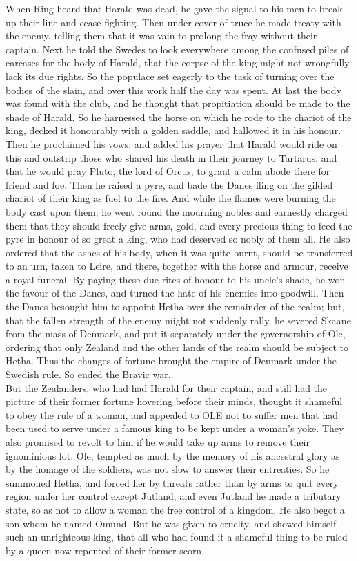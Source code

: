 \documentclass[10pt,a4paper]{report}
\begin{document}
When Ring heard that Harald was dead, he gave the signal to his men to break up their line and cease fighting. Then under cover of truce he made treaty with the enemy, telling them that it was vain to prolong the fray without their captain. Next he told the Swedes to look everywhere among the confused piles of carcases for the body of Harald, that the corpse of the king might not wrongfully lack its due rights. So the populace set eagerly to the task of turning over the bodies of the slain, and over this work half the day was spent. At last the body was found with the club, and he thought that propitiation should be made to the shade of Harald. So he harnessed the horse on which he rode to the chariot of the king, decked it honourably with a golden saddle, and hallowed it in his honour. Then he proclaimed his vows, and added his prayer that Harald would ride on this and outstrip those who shared his death in their journey to Tartarus; and that he would pray Pluto, the lord of Orcus, to grant a calm abode there for friend and foe. Then he raised a pyre, and bade the Danes fling on the gilded chariot of their king as fuel to the fire. And while the flames were burning the body cast upon them, he went round the mourning nobles and earnestly charged them that they should freely give arms, gold, and every precious thing to feed the pyre in honour of so great a king, who had deserved so nobly of them all. He also ordered that the ashes of his body, when it was quite burnt, should be transferred to an urn, taken to Leire, and there, together with the horse and armour, receive a royal funeral. By paying these due rites of honour to his uncle's shade, he won the favour of the Danes, and turned the hate of his enemies into goodwill. Then the Danes besought him to appoint Hetha over the remainder of the realm; but, that the fallen strength of the enemy might not suddenly rally, he severed Skaane from the mass of Denmark, and put it separately under the governorship of Ole, ordering that only Zealand and the other lands of the realm should be subject to Hetha. Thus the changes of fortune brought the empire of Denmark under the Swedish rule. So ended the Bravic war.\\

But the Zealanders, who had had Harald for their captain, and still had the picture of their former fortune hovering before their minds, thought it shameful to obey the rule of a woman, and appealed to OLE not to suffer men that had been used to serve under a famous king to be kept under a woman's yoke. They also promised to revolt to him if he would take up arms to remove their ignominious lot. Ole, tempted as much by the memory of his ancestral glory as by the homage of the soldiers, was not slow to answer their entreaties. So he summoned Hetha, and forced her by threats rather than by arms to quit every region under her control except Jutland; and even Jutland he made a tributary state, so as not to allow a woman the free control of a kingdom. He also begot a son whom he named Omund. But he was given to cruelty, and showed himself such an unrighteous king, that all who had found it a shameful thing to be ruled by a queen now repented of their former scorn.\\
\end{document}
